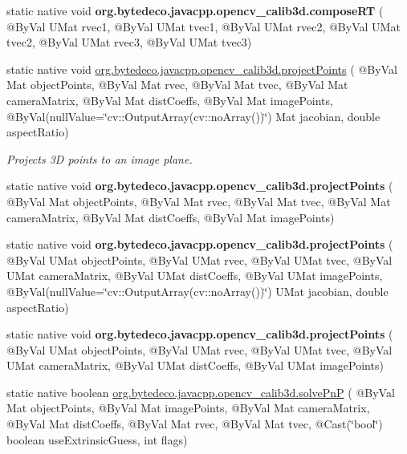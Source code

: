 \begin{DoxyCompactItemize}
\item 
\mbox{\label{group__calib3d_ga9c9ba5efd66c7340b0ffdf45f8330004}} 
static native void {\bfseries org.\+bytedeco.\+javacpp.\+opencv\+\_\+calib3d.\+compose\+RT} ( @By\+Val U\+Mat rvec1, @By\+Val U\+Mat tvec1, @By\+Val U\+Mat rvec2, @By\+Val U\+Mat tvec2, @By\+Val U\+Mat rvec3, @By\+Val U\+Mat tvec3)
\item 
static native void \hyperlink{group__calib3d_gaa19528257b52c058dffc58aba4f6d751}{org.\+bytedeco.\+javacpp.\+opencv\+\_\+calib3d.\+project\+Points} ( @By\+Val Mat object\+Points, @By\+Val Mat rvec, @By\+Val Mat tvec, @By\+Val Mat camera\+Matrix, @By\+Val Mat dist\+Coeffs, @By\+Val Mat image\+Points, @By\+Val(null\+Value=\char`\"{}cv\+::\+Output\+Array(cv\+::no\+Array())\char`\"{}) Mat jacobian, double aspect\+Ratio)
\begin{DoxyCompactList}\small\item\em Projects 3D points to an image plane. \end{DoxyCompactList}\item 
\mbox{\label{group__calib3d_gaa9bef47acb319b6248b4f1b858995531}} 
static native void {\bfseries org.\+bytedeco.\+javacpp.\+opencv\+\_\+calib3d.\+project\+Points} ( @By\+Val Mat object\+Points, @By\+Val Mat rvec, @By\+Val Mat tvec, @By\+Val Mat camera\+Matrix, @By\+Val Mat dist\+Coeffs, @By\+Val Mat image\+Points)
\item 
\mbox{\label{group__calib3d_ga97adc15ffdd4b5f65369a79ad99e5c26}} 
static native void {\bfseries org.\+bytedeco.\+javacpp.\+opencv\+\_\+calib3d.\+project\+Points} ( @By\+Val U\+Mat object\+Points, @By\+Val U\+Mat rvec, @By\+Val U\+Mat tvec, @By\+Val U\+Mat camera\+Matrix, @By\+Val U\+Mat dist\+Coeffs, @By\+Val U\+Mat image\+Points, @By\+Val(null\+Value=\char`\"{}cv\+::\+Output\+Array(cv\+::no\+Array())\char`\"{}) U\+Mat jacobian, double aspect\+Ratio)
\item 
\mbox{\label{group__calib3d_ga96b03cc54cf31ae1e24f824221d0efbc}} 
static native void {\bfseries org.\+bytedeco.\+javacpp.\+opencv\+\_\+calib3d.\+project\+Points} ( @By\+Val U\+Mat object\+Points, @By\+Val U\+Mat rvec, @By\+Val U\+Mat tvec, @By\+Val U\+Mat camera\+Matrix, @By\+Val U\+Mat dist\+Coeffs, @By\+Val U\+Mat image\+Points)
\item 
static native boolean \hyperlink{group__calib3d_ga4ed4dcff68153a9ec5eb087c0ee29913}{org.\+bytedeco.\+javacpp.\+opencv\+\_\+calib3d.\+solve\+PnP} ( @By\+Val Mat object\+Points, @By\+Val Mat image\+Points, @By\+Val Mat camera\+Matrix, @By\+Val Mat dist\+Coeffs, @By\+Val Mat rvec, @By\+Val Mat tvec, @Cast(\char`\"{}bool\char`\"{}) boolean use\+Extrinsic\+Guess, int flags)

\end{DoxyCompactItemize}
